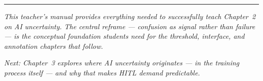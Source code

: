 \bigskip
\begin{center}
\rule{0.5\textwidth}{0.4pt}
\end{center}
\bigskip

\noindent\textit{This teacher's manual provides everything needed to successfully teach Chapter~2 on AI uncertainty. The central reframe --- confusion as signal rather than failure --- is the conceptual foundation students need for the threshold, interface, and annotation chapters that follow.}

\medskip
\noindent\textit{Next: Chapter~3 explores where AI uncertainty originates --- in the training process itself --- and why that makes HITL demand predictable.}
